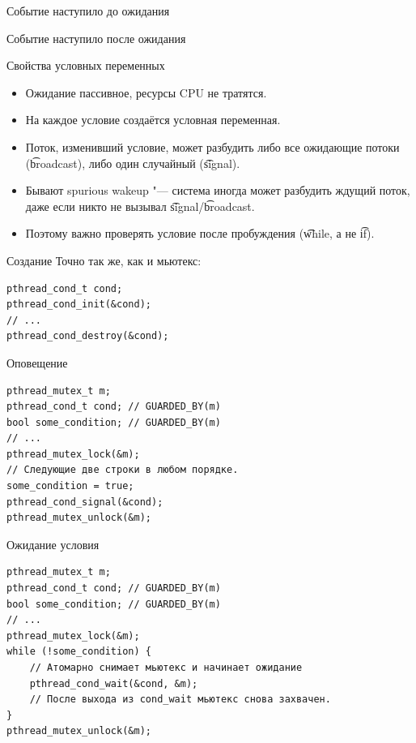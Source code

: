 \begin{frame}{Событие наступило до ожидания}
\end{frame}

\begin{frame}{Событие наступило после ожидания}
\end{frame}

\begin{frame}{Свойства условных переменных}
	\begin{itemize}
		\item Ожидание пассивное, ресурсы CPU не тратятся.
		\item На каждое условие создаётся условная переменная.
		\item Поток, изменивший условие, может разбудить либо все ожидающие потоки (\t{broadcast}), либо один случайный (\t{signal}).
		\item Бывают spurious wakeup "--- система иногда может разбудить ждущий поток, даже если никто не вызывал \t{signal}/\t{broadcast}.
		\item Поэтому важно проверять условие после пробуждения (\t{while}, а не \t{if}).
	\end{itemize}
\end{frame}

\begin{frame}[fragile]{Создание}
	Точно так же, как и мьютекс:
\begin{verbatim}
pthread_cond_t cond;
pthread_cond_init(&cond);
// ...
pthread_cond_destroy(&cond);
\end{verbatim}
\end{frame}

\begin{frame}[fragile]{Оповещение}
\begin{verbatim}
pthread_mutex_t m;
pthread_cond_t cond; // GUARDED_BY(m)
bool some_condition; // GUARDED_BY(m)
// ...
pthread_mutex_lock(&m);
// Следующие две строки в любом порядке.
some_condition = true;
pthread_cond_signal(&cond);
pthread_mutex_unlock(&m);
\end{verbatim}
\end{frame}

\begin{frame}[fragile]{Ожидание условия}
\begin{verbatim}
pthread_mutex_t m;
pthread_cond_t cond; // GUARDED_BY(m)
bool some_condition; // GUARDED_BY(m)
// ...
pthread_mutex_lock(&m);
while (!some_condition) {
    // Атомарно снимает мьютекс и начинает ожидание
    pthread_cond_wait(&cond, &m);
    // После выхода из cond_wait мьютекс снова захвачен.
}
pthread_mutex_unlock(&m);
\end{verbatim}
\end{frame}

